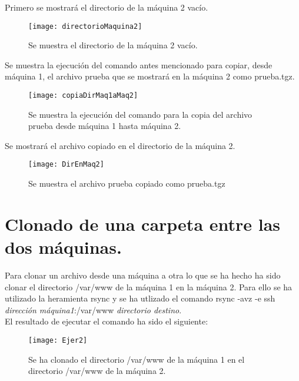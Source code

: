   Primero se mostrará el directorio de la máquina 2 vacío.\\

  \begin{figure}[H]
		\centering
		\texttt{[image: directorioMaquina2]}
		\caption{Se muestra el directorio de la máquina 2 vacío.}
		\label{figura 1}
	\end{figure}

  Se muestra la ejecución del comando antes mencionado para copiar, desde máquina 1, el archivo prueba que se mostrará en la máquina 2 como prueba.tgz.\\

  \begin{figure}[H]
		\centering
		\texttt{[image: copiaDirMaq1aMaq2]}
		\caption{Se muestra la ejecución del comando para la copia del archivo prueba desde máquina 1 hasta máquina 2.}
		\label{figura 2}
	\end{figure}

  Se mostrará el archivo copiado en el directorio de la máquina 2.\\

  \begin{figure}[H]
		\centering
		\texttt{[image: DirEnMaq2]}
		\caption{Se muestra el archivo prueba copiado como prueba.tgz}
		\label{figura 3}
	\end{figure}



\section{ Clonado de una carpeta entre las dos máquinas.}
	Para clonar un archivo desde una máquina a otra lo que se ha hecho ha sido clonar el directorio /var/www de la máquina 1 en la máquina 2. Para ello se ha utilizado la heramienta rsync y se ha utlizado el comando rsync -avz -e ssh \textit{dirección máquina1}:/var/www \textit{directorio destino}.\\
  El resultado de ejecutar el comando ha sido el siguiente:\\

  \begin{figure}[H]
		\centering
		\texttt{[image: Ejer2]}
		\caption{Se ha clonado el directorio /var/www de la máquina 1 en el directorio /var/www de la máquina 2.}
		\label{figura 4}
	\end{figure}

